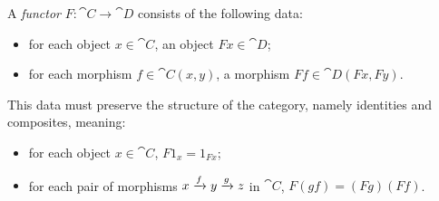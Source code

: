 \begin{dfn}[functor]\label{def:functor}
  A \emph{functor} $F: \cat{C}\to\cat{D}$ consists of the following data:
  \begin{itemize}
    \item for each object $x\in\cat{C}$, an object $Fx\in\cat{D}$;
    \item for each morphism $f\in\cat{C}(x, y)$, a morphism $Ff\in\cat{D}(Fx, Fy)$.
  \end{itemize}
  This data must preserve the structure of the category, namely identities and
  composites, meaning:
  \begin{itemize}
    \item for each object $x\in\cat{C}$, $F1_x = 1_{Fx}$;
    \item for each pair of morphisms $x\xrightarrow{f}y\xrightarrow{g} z$ in $\cat{C}$, $F(gf) =
      (Fg)(Ff)$.
  \end{itemize}
\end{dfn}

